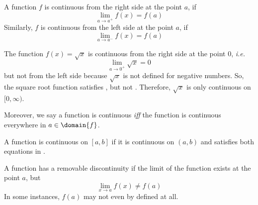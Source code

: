 \begin{definition}\label{def-one-sided-continuity}
	A function $f$ is continuous from the right side at the point $a$, if
	\begin{equation*}
		\lim_{a \to a^+} f(x)=f(a)
	\end{equation*}
	Similarly, $f$ is continuous from the left side at the point $a$, if
	\begin{equation*}
		\lim_{a \to a^-} f(x)=f(a)
	\end{equation*}
\end{definition}

\begin{exm}\label{exm-one-sided-continuity}
	The function $f(x)=\sqrt{x}$ is continuous from the right side at the point $0$,
	\textit{i.e.}
	\begin{equation*}
		\lim_{a \to 0^+} \sqrt{x}=0
	\end{equation*}
	but not from the left side because $\sqrt{x}$ is not defined for negative numbers.
	So, the square root function satisfies ,
	but not . Therefore, $\sqrt{x}$ is
	only continuous on $[0,\infty)$.
\end{exm}

\begin{definition}\label{def-continuity}
	Moreover, we say a function is continuous \textit{iff} the function is continuous
	everywhere in $a\in\domain{f}$.
\end{definition}

\begin{rem}\label{rem-continuity}
	A function is continuous on $[a,b]$ if it is continuous on $(a,b)$ and satisfies
	both equations in .
\end{rem}

\begin{definition}\label{def-removable-discontinuity}
	A function has a removable discontinuity if the limit of the function exists
	at the point $a$, but
	\begin{equation*}
		\lim_{x \to a}f(x)\neq f(a)
	\end{equation*}
	In some instances, $f(a)$ may not even by defined at all.
\end{definition}

